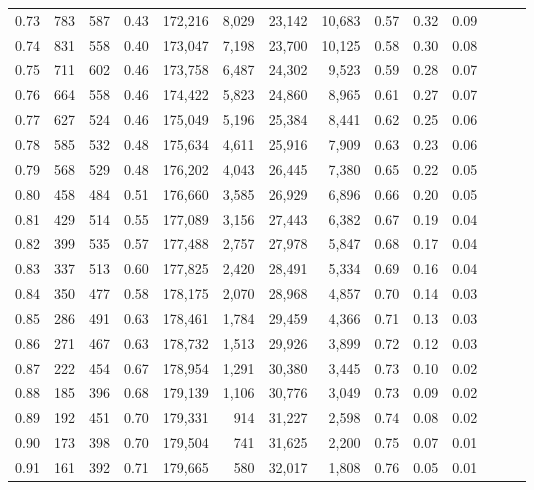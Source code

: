 \begin{tabular}{rrrrrrrrrrrrrr}
0.73 &    783 &  587 &  0.43 &  172,216 &    8,029 &  23,142 &  10,683 &  0.57 &  0.32 &      0.09 \\
0.74 &    831 &  558 &  0.40 &  173,047 &    7,198 &  23,700 &  10,125 &  0.58 &  0.30 &      0.08 \\
0.75 &    711 &  602 &  0.46 &  173,758 &    6,487 &  24,302 &   9,523 &  0.59 &  0.28 &      0.07 \\
0.76 &    664 &  558 &  0.46 &  174,422 &    5,823 &  24,860 &   8,965 &  0.61 &  0.27 &      0.07 \\
0.77 &    627 &  524 &  0.46 &  175,049 &    5,196 &  25,384 &   8,441 &  0.62 &  0.25 &      0.06 \\
0.78 &    585 &  532 &  0.48 &  175,634 &    4,611 &  25,916 &   7,909 &  0.63 &  0.23 &      0.06 \\
0.79 &    568 &  529 &  0.48 &  176,202 &    4,043 &  26,445 &   7,380 &  0.65 &  0.22 &      0.05 \\
0.80 &    458 &  484 &  0.51 &  176,660 &    3,585 &  26,929 &   6,896 &  0.66 &  0.20 &      0.05 \\
0.81 &    429 &  514 &  0.55 &  177,089 &    3,156 &  27,443 &   6,382 &  0.67 &  0.19 &      0.04 \\
0.82 &    399 &  535 &  0.57 &  177,488 &    2,757 &  27,978 &   5,847 &  0.68 &  0.17 &      0.04 \\
0.83 &    337 &  513 &  0.60 &  177,825 &    2,420 &  28,491 &   5,334 &  0.69 &  0.16 &      0.04 \\
0.84 &    350 &  477 &  0.58 &  178,175 &    2,070 &  28,968 &   4,857 &  0.70 &  0.14 &      0.03 \\
0.85 &    286 &  491 &  0.63 &  178,461 &    1,784 &  29,459 &   4,366 &  0.71 &  0.13 &      0.03 \\
0.86 &    271 &  467 &  0.63 &  178,732 &    1,513 &  29,926 &   3,899 &  0.72 &  0.12 &      0.03 \\
0.87 &    222 &  454 &  0.67 &  178,954 &    1,291 &  30,380 &   3,445 &  0.73 &  0.10 &      0.02 \\
0.88 &    185 &  396 &  0.68 &  179,139 &    1,106 &  30,776 &   3,049 &  0.73 &  0.09 &      0.02 \\
0.89 &    192 &  451 &  0.70 &  179,331 &      914 &  31,227 &   2,598 &  0.74 &  0.08 &      0.02 \\
0.90 &    173 &  398 &  0.70 &  179,504 &      741 &  31,625 &   2,200 &  0.75 &  0.07 &      0.01 \\
0.91 &    161 &  392 &  0.71 &  179,665 &      580 &  32,017 &   1,808 &  0.76 &  0.05 &      0.01 \\

\end{tabular}
